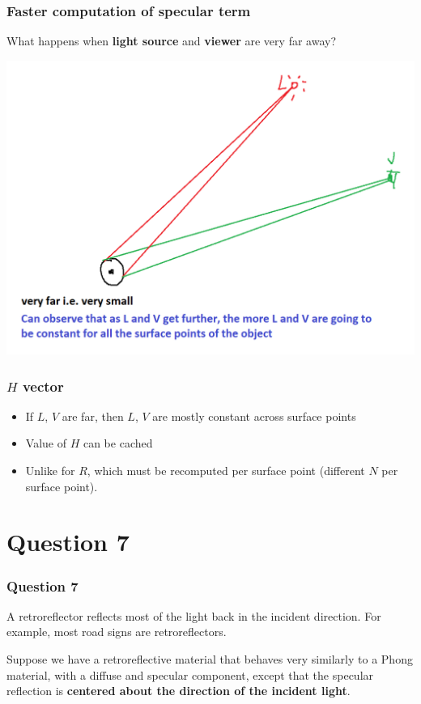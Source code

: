 \documentclass{beamer}
\begin{document}
\begin{frame}
    \frametitle{Faster computation of specular term}

    What happens when \textbf{light source} and \textbf{viewer} are very far away?

    \begin{center}
        \includegraphics[scale=0.5]{NHvsRV.png}
    \end{center}

\end{frame}

\begin{frame}
    \frametitle{$H$ vector}

    \begin{itemize}
        \item If $L$, $V$ are far, then $L$, $V$ are mostly constant across surface points
        \item Value of $H$ can be cached
        \item Unlike for $R$, which must be recomputed per surface point (different $N$ per surface point).
    \end{itemize}

\end{frame}

\section{Question 7}

\begin{frame}
    \frametitle{Question 7}

    A retroreflector reflects most of the light back in the incident direction. 
    For example, most road signs are retroreflectors. 

    \vspace*{1em}

    Suppose we have a retroreflective material that behaves very similarly to a Phong material,
    with a diffuse and specular component, except that the specular reflection is \textbf{centered 
    about the direction of the incident light}.

    \vspace*{1em}

\end{frame}
\end{document}
